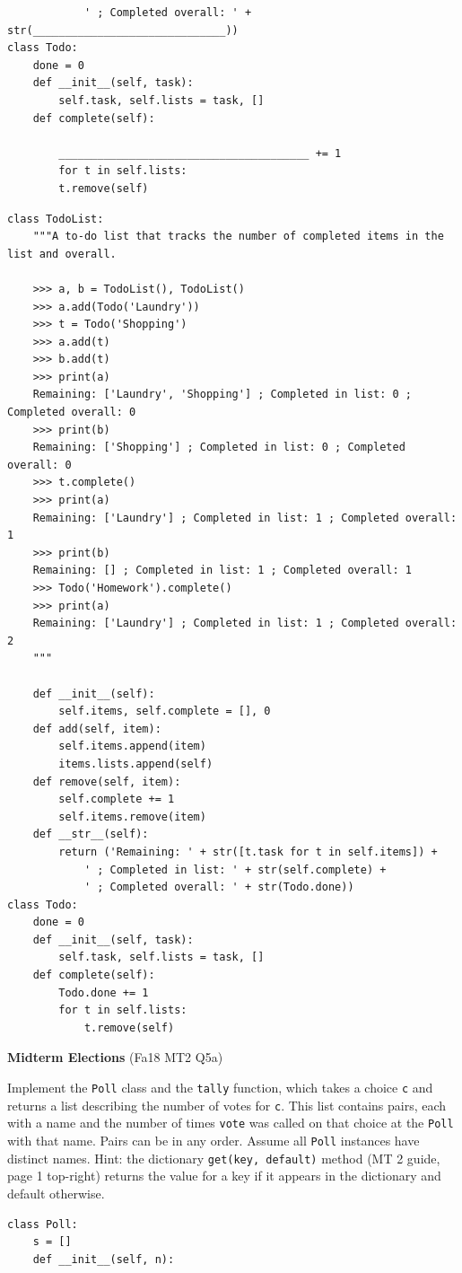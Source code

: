 \documentclass{exam}
\newlength{\currentparskip}
\newenvironment{blocksection}
{
    \setlength{\currentparskip}{\parskip}%
    \begin{minipage}{\linewidth}
    \setlength{\parskip}{\currentparskip}%
}
{
    \end{minipage}
}
\begin{document}
\begin{questions}
\begin{blocksection}
\begin{lstlisting}
            ' ; Completed overall: ' + str(______________________________))
class Todo:
    done = 0
    def __init__(self, task):
        self.task, self.lists = task, []
    def complete(self):

        _______________________________________ += 1
        for t in self.lists:
        t.remove(self)
    \end{lstlisting}
\end{blocksection}
\begin{solution}
    \begin{lstlisting}
class TodoList:
    """A to-do list that tracks the number of completed items in the list and overall.

    >>> a, b = TodoList(), TodoList()
    >>> a.add(Todo('Laundry'))
    >>> t = Todo('Shopping')
    >>> a.add(t)
    >>> b.add(t)
    >>> print(a)
    Remaining: ['Laundry', 'Shopping'] ; Completed in list: 0 ; Completed overall: 0
    >>> print(b)
    Remaining: ['Shopping'] ; Completed in list: 0 ; Completed overall: 0
    >>> t.complete()
    >>> print(a)
    Remaining: ['Laundry'] ; Completed in list: 1 ; Completed overall: 1
    >>> print(b)
    Remaining: [] ; Completed in list: 1 ; Completed overall: 1
    >>> Todo('Homework').complete()
    >>> print(a)
    Remaining: ['Laundry'] ; Completed in list: 1 ; Completed overall: 2
    """
        
    def __init__(self):
        self.items, self.complete = [], 0
    def add(self, item):
        self.items.append(item)
        items.lists.append(self)
    def remove(self, item):
        self.complete += 1
        self.items.remove(item)
    def __str__(self):
        return ('Remaining: ' + str([t.task for t in self.items]) + 
            ' ; Completed in list: ' + str(self.complete) +
            ' ; Completed overall: ' + str(Todo.done))
class Todo:
    done = 0
    def __init__(self, task):
        self.task, self.lists = task, []
    def complete(self):
        Todo.done += 1
        for t in self.lists:
            t.remove(self)
\end{lstlisting}
\end{solution}

\begin{blocksection}
\question \textbf{Midterm Elections} (Fa18 MT2 Q5a)

    Implement the \lstinline{Poll} class and the \lstinline{tally} function, which takes a choice \lstinline{c} and returns a list
    describing the number of votes for \lstinline{c}. This list contains pairs, each with a name and the number of times
    \lstinline{vote} was called on that choice at the \lstinline{Poll} with that name. Pairs can be in any order. Assume all \lstinline{Poll}
    instances have distinct names. Hint: the dictionary \lstinline{get(key, default)} method (MT 2 guide, page 1
    top-right) returns the value for a key if it appears in the dictionary and default otherwise.
\begin{lstlisting}
class Poll:
    s = []
    def __init__(self, n):


\end{lstlisting}
\end{blocksection}
\end{questions}
\end{document}
